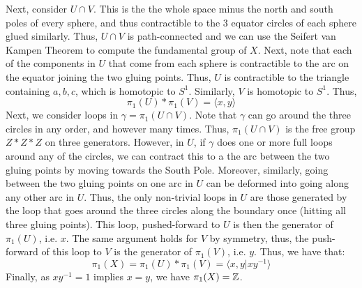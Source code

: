 \documentclass[12pt]{article}
\begin{document}
\begin{solution}
\begin{enumerate}
        Next, consider $U \cap V$. This is the the whole space minus the north and south poles of every sphere, and thus contractible to the $3$ equator circles of each sphere glued similarly. Thus, $U \cap V$ is path-connected and we can use the Seifert van Kampen Theorem to compute the fundamental group of $X$. \bbni
        Next, note that each of the components in $U$ that come from each sphere is contractible to the arc on the equator joining the two gluing points. Thus, $U$ is contractible to the triangle containing $a, b, c$, which is homotopic to $S^1$. Similarly, $V$ is homotopic to $S^1$. Thus, 
        \[ \pi_1(U) * \pi_1(V) = \langle x, y \rangle \]
        Next, we consider loops in $\gamma = \pi_1(U \cap V)$. Note that $\gamma$ can go around the three circles in any order, and however many times. Thus, $\pi_1(U \cap V)$ is the free group $Z * Z * Z$ on three generators. However, in $U$, if $\gamma$ does one or more full loops around any of the circles, we can contract this to a the arc between the two gluing points by moving towards the South Pole. Moreover, similarly, going between the two gluing points on one arc in $U$ can be deformed into going along any other arc in $U$. Thus, the only non-trivial loops in $U$ are those generated by the loop that goes around the three circles along the boundary once (hitting all three gluing points). This loop, pushed-forward to $U$ is then the generator of $\pi_1(U)$, i.e. $x$. The same argument holds for $V$ by symmetry, thus, the push-forward of this loop to $V$ is the generator of $\pi_1(V)$, i.e. $y$. Thus, we have that:
        \[ \pi_1(X) = \pi_1(U) * \pi_1(V) = \langle x, y | xy^{-1} \rangle\]
        Finally, as $xy^{-1} = 1$ implies $x = y$, we have $\pi_1(X) = \mathbb Z$.    
    \end{enumerate}
\end{solution}
\newpage
\end{document}
